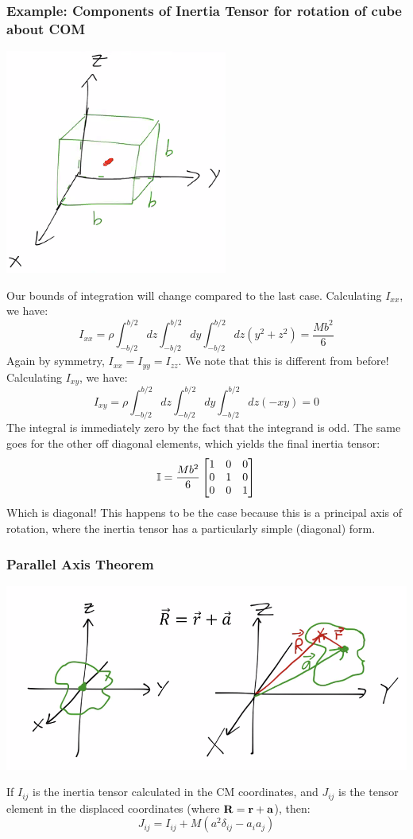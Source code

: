 \subsubsection{Example: Components of Inertia Tensor for rotation of cube about COM}
\begin{center}
    \includegraphics[scale=1]{Lecture-18/l18-img4.png}
\end{center}
Our bounds of integration will change compared to the last case. Calculating $I_{xx}$, we have:
\[I_{xx} = \rho\int_{-b/2}^{b/2}dz\int_{-b/2}^{b/2}dy\int_{-b/2}^{b/2}dz(y^2 + z^2) = \frac{Mb^2}{6}\]
Again by symmetry, $I_{xx} = I_{yy} = I_{zz}$. We note that this is different from before! Calculating $I_{xy}$, we have:
\[I_{xy} = \rho\int_{-b/2}^{b/2}dz\int_{-b/2}^{b/2}dy\int_{-b/2}^{b/2}dz(-xy) = 0\]
The integral is immediately zero by the fact that the integrand is odd. The same goes for the other off diagonal elements, which yields the final inertia tensor:
\[\mathbb{I} = \frac{Mb^2}{6}\begin{bmatrix}1 & 0 & 0 \\ 0 & 1 & 0 \\ 0 & 0 & 1\end{bmatrix}\]
Which is diagonal! This happens to be the case because this is a principal axis of rotation, where the inertia tensor has a particularly simple (diagonal) form.

\subsubsection{Parallel Axis Theorem}
\begin{center}
    \includegraphics[scale=0.5]{Lecture-18/l18-img5.png}
\end{center}
If $I_{ij}$ is the inertia tensor calculated in the CM coordinates, and $J_{ij}$ is the tensor element in the displaced coordinates (where $\mathbf{R} = \mathbf{r} + \mathbf{a}$), then:
\[J_{ij} = I_{ij} + M(a^2\delta_{ij} - a_ia_j)\]

